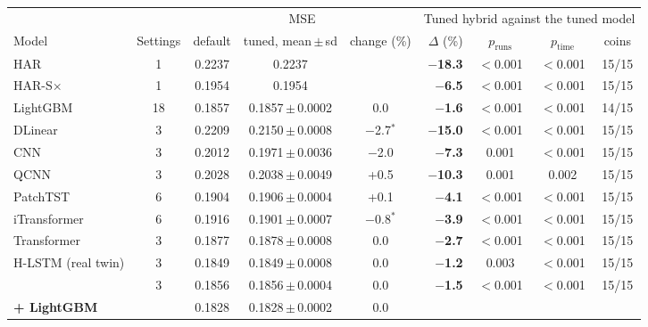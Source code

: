 \begin{tabular}{@{}lccccrccc@{}}
\toprule
 & & \multicolumn{3}{c}{MSE} & \multicolumn{4}{c}{Tuned hybrid against the tuned model} \\
\cmidrule(lr){3-5}\cmidrule(l){6-9}
Model & Settings & default & tuned, mean\,$\pm$\,sd & change (\%) & $\Delta$ (\%) & $p_{\mathrm{runs}}$ & $p_{\mathrm{time}}$ & coins \\
\midrule
HAR & 1 & 0.2237 & 0.2237 &  & \textbf{$-$18.3} & $<$0.001 & $<$0.001 & 15/15 \\
HAR-S$\times$ & 1 & 0.1954 & 0.1954 &  & \textbf{$-$6.5} & $<$0.001 & $<$0.001 & 15/15 \\
LightGBM & 18 & 0.1857 & 0.1857\,$\pm$\,0.0002 & 0.0 & \textbf{$-$1.6} & $<$0.001 & $<$0.001 & 14/15 \\
DLinear & 3 & 0.2209 & 0.2150\,$\pm$\,0.0008 & $-$2.7$^{*}$ & \textbf{$-$15.0} & $<$0.001 & $<$0.001 & 15/15 \\
CNN & 3 & 0.2012 & 0.1971\,$\pm$\,0.0036 & $-$2.0 & \textbf{$-$7.3} & 0.001 & $<$0.001 & 15/15 \\
QCNN & 3 & 0.2028 & 0.2038\,$\pm$\,0.0049 & +0.5 & \textbf{$-$10.3} & 0.001 & 0.002 & 15/15 \\
PatchTST & 6 & 0.1904 & 0.1906\,$\pm$\,0.0004 & +0.1 & \textbf{$-$4.1} & $<$0.001 & $<$0.001 & 15/15 \\
iTransformer & 6 & 0.1916 & 0.1901\,$\pm$\,0.0007 & $-$0.8$^{*}$ & \textbf{$-$3.9} & $<$0.001 & $<$0.001 & 15/15 \\
Transformer & 3 & 0.1877 & 0.1878\,$\pm$\,0.0008 & 0.0 & \textbf{$-$2.7} & $<$0.001 & $<$0.001 & 15/15 \\
H-LSTM (real twin) & 3 & 0.1849 & 0.1849\,$\pm$\,0.0008 & 0.0 & \textbf{$-$1.2} & 0.003 & $<$0.001 & 15/15 \\
\HQ{} & 3 & 0.1856 & 0.1856\,$\pm$\,0.0004 & 0.0 & \textbf{$-$1.5} & $<$0.001 & $<$0.001 & 15/15 \\
\addlinespace[2pt]
\textbf{\HQ{} + LightGBM} &  & 0.1828 & 0.1828\,$\pm$\,0.0002 & 0.0 &  &  &  &  \\
\bottomrule
\end{tabular}
